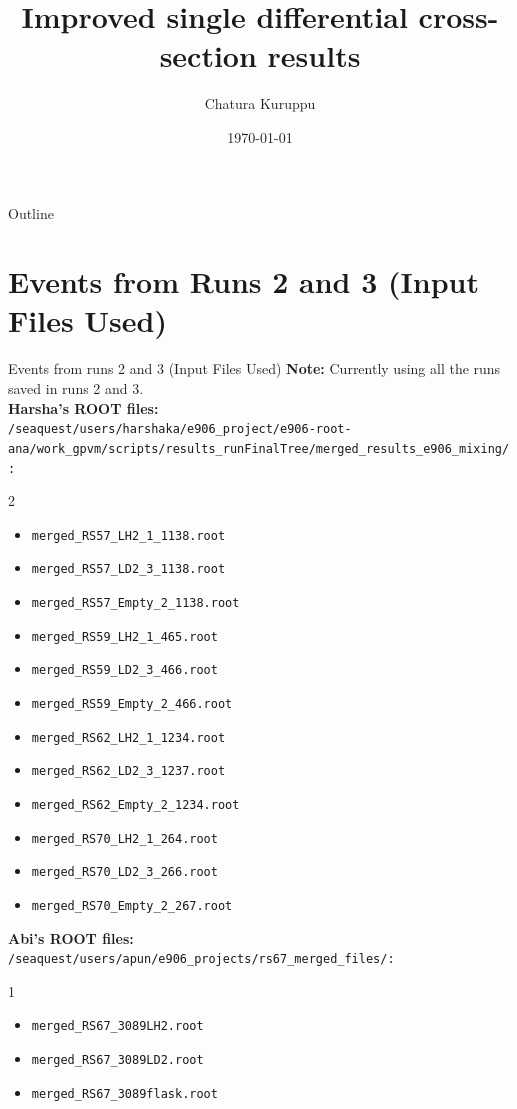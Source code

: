 \documentclass[aspectratio=169, 10pt]{beamer}
\title[DY Absolute Cross-Section]{Improved single differential cross-section results}
\author[C. Kuruppu]{Chatura Kuruppu}
\institute[NMSU]{New Mexico State University}
\date{\today}
\begin{document}
\begin{frame}
    \titlepage
\end{frame}

\begin{frame}{Outline}
    \tableofcontents[hideallsubsections]
\end{frame}


\section{Events from Runs 2 and 3 (Input Files Used)}

\begin{frame}{Events from runs 2 and 3 (Input Files Used)}
\textbf{Note:} Currently using all the runs saved in runs 2 and 3.
\vspace{0.3cm}
\tiny\\
\textbf{Harsha's ROOT files:} \\
\texttt{/seaquest/users/harshaka/e906\_project/e906-root-ana/work\_gpvm/scripts/results\_runFinalTree/merged\_results\_e906\_mixing/:}
\begin{multicols}{2}
\begin{itemize}
    \item \texttt{merged\_RS57\_LH2\_1\_1138.root}
    \item \texttt{merged\_RS57\_LD2\_3\_1138.root}
    \item \texttt{merged\_RS57\_Empty\_2\_1138.root}
    \item \texttt{merged\_RS59\_LH2\_1\_465.root}
    \item \texttt{merged\_RS59\_LD2\_3\_466.root}
    \item \texttt{merged\_RS59\_Empty\_2\_466.root}
    \item \texttt{merged\_RS62\_LH2\_1\_1234.root}
    \item \texttt{merged\_RS62\_LD2\_3\_1237.root}
    \item \texttt{merged\_RS62\_Empty\_2\_1234.root}
    \item \texttt{merged\_RS70\_LH2\_1\_264.root}
    \item \texttt{merged\_RS70\_LD2\_3\_266.root}
    \item \texttt{merged\_RS70\_Empty\_2\_267.root}
\end{itemize}
\end{multicols}
\textbf{Abi's ROOT files:} \\
\texttt{/seaquest/users/apun/e906\_projects/rs67\_merged\_files/:}
\begin{multicols}{1}
\begin{itemize}
    \item \texttt{merged\_RS67\_3089LH2.root}
    \item \texttt{merged\_RS67\_3089LD2.root}
    \item \texttt{merged\_RS67\_3089flask.root}
\end{itemize}
\end{multicols}

\normalsize
\end{frame}
\end{document}
